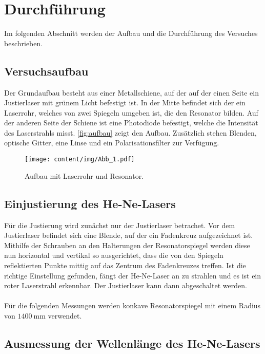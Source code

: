\section{Durchführung}
\label{sec:durchfuehrung}

    Im folgenden Abschnitt werden der Aufbau und die Durchführung des Versuches beschrieben.

\subsection{Versuchsaufbau}
\label{sec:versuchsaufbau}

    Der Grundaufbau besteht aus einer Metallschiene,
    auf der auf der einen Seite ein Justierlaser mit grünem Licht befestigt ist.
    In der Mitte befindet sich der ein Laserrohr,
    welches von zwei Spiegeln umgeben ist,
    die den Resonator bilden.
    Auf der anderen Seite der Schiene ist eine Photodiode befestigt,
    welche die Intensität des Laserstrahls misst.
    \autoref{fig:aufbau} zeigt den Aufbau.
    Zusätzlich stehen Blenden, optische Gitter, eine Linse und ein Polarisationsfilter zur Verfügung.

    \begin{figure}
      \centering
      \texttt{[image: content/img/Abb\_1.pdf]}
      \caption{Aufbau mit Laserrohr und Resonator.}
      \label{fig:aufbau}
    \end{figure}


\subsection{Einjustierung des He-Ne-Lasers}

    Für die Justierung wird zunächst nur der Justierlaser betrachet.
    Vor dem Justierlaser befindet sich eine Blende,
    auf der ein Fadenkreuz aufgezeichnet ist.
    Mithilfe der Schrauben an den Halterungen der Resonatorspiegel werden diese nun horizontal und vertikal so ausgerichtet,
    dass die von den Spiegeln reflektierten Punkte mittig auf das Zentrum des Fadenkreuzes treffen.
    Ist die richtige Einstellung gefunden,
    fängt der He-Ne-Laser an zu strahlen und es ist ein roter Laserstrahl erkennbar.
    Der Justierlaser kann dann abgeschaltet werden.\\
    \\
    Für die folgenden Messungen werden konkave Resonatorspiegel mit einem Radius von $\SI{1400}{\milli\meter}$ verwendet.

\subsection{Ausmessung der Wellenlänge des He-Ne-Lasers}


